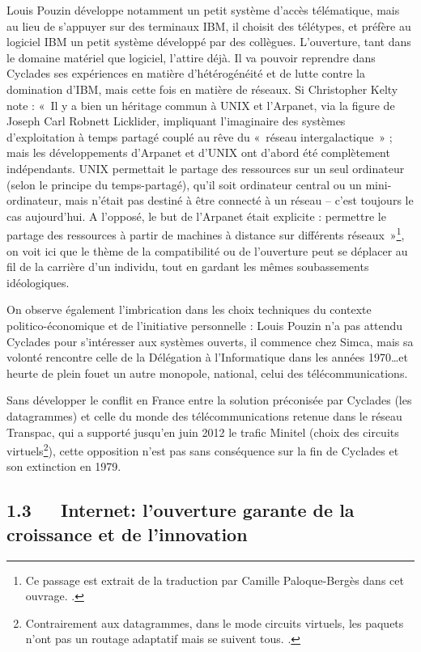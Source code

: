 \documentclass{FramateX}
\begin{document}
\begin{refsection}
Louis Pouzin développe notamment un petit système
d'accès télématique, mais au lieu de
s'appuyer sur des terminaux IBM, il choisit des
télétypes, et préfère au logiciel IBM un petit système développé par
des collègues. L'ouverture, tant dans le domaine
matériel que logiciel, l'attire déjà. Il va pouvoir
reprendre dans Cyclades ses expériences en matière
d'hétérogénéité et de lutte contre la domination
d'IBM, mais cette fois en matière de réseaux. Si
Christopher Kelty note : «~Il y a bien un héritage commun à UNIX et l'Arpanet, via la figure de Joseph Carl Robnett
Licklider, impliquant l'imaginaire des systèmes
d'exploitation à temps partagé couplé au rêve du
«~réseau intergalactique~» ; mais les développements
d'Arpanet et d'UNIX ont
d'abord été complètement indépendants. UNIX permettait
le partage des ressources sur un seul ordinateur (selon le principe du
temps-partagé), qu'il soit ordinateur central ou un
mini-ordinateur, mais n'était pas destiné à être
connecté à un réseau – c'est toujours le cas
aujourd'hui. A l'opposé, le but de
l'Arpanet était explicite : permettre le partage des
ressources à partir de machines à distance sur différents
réseaux~»\footnote{Ce passage est extrait de la traduction par Camille
Paloque-Bergès dans cet ouvrage. \cite[p.~118-143]{keltytwo2008}.}, on voit ici que le thème de la compatibilité ou de l'ouverture peut se déplacer au fil de la carrière
d'un individu, tout en gardant les mêmes soubassements
idéologiques.

On observe également l'imbrication dans les choix
techniques du contexte politico-économique et de
l'initiative personnelle : Louis Pouzin
n'a pas attendu Cyclades pour
s'intéresser aux systèmes ouverts, il commence chez
Simca, mais sa volonté rencontre celle de la Délégation à
l'Informatique dans les années 1970\ldots et heurte de
plein fouet un autre monopole, national, celui des télécommunications.

Sans développer le conflit en France entre la solution préconisée par
Cyclades (les datagrammes) et celle du monde des télécommunications
retenue dans le réseau Transpac, qui a supporté
jusqu'en juin 2012 le trafic Minitel (choix des
circuits virtuels\footnote{Contrairement aux datagrammes, dans le
mode circuits virtuels, les paquets n'ont pas un
routage adaptatif mais se suivent tous. \cite{schaferfrance2012}.}), cette opposition
n'est pas sans conséquence sur la fin de Cyclades et
son extinction en 1979.

\subsection*{1.3~~~Internet: l'ouverture garante de la croissance et de l'innovation}
{}


\end{refsection}
\end{document}
